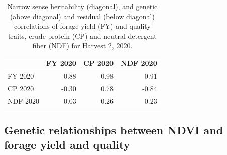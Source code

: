 \documentclass[12pt, letterpaper]{article}
\begin{document}
\begin{table}[ht]
\caption{Narrow sense heritability (diagonal), and genetic (above diagonal) and residual (below diagonal) correlations of forage yield (FY) and quality traits, crude protein (CP) and neutral detergent fiber (NDF) for Harvest 2, 2020.}
\centering
\begin{tabular*}{\hsize}{@{\extracolsep{\fill}}lrrr}
 & FY 2020 & CP 2020 & NDF 2020 \\ 
  \hline
FY 2020 & 0.88 & -0.98 & 0.91 \\ 
  CP 2020 & -0.30 & 0.78 & -0.84 \\ 
  NDF 2020 & 0.03 & -0.26 & 0.23 \\ 
   \hline
\end{tabular*}
\label{genCorQual20}
\end{table}


\subsection{Genetic relationships between NDVI and forage yield and quality}	
\end{document}

